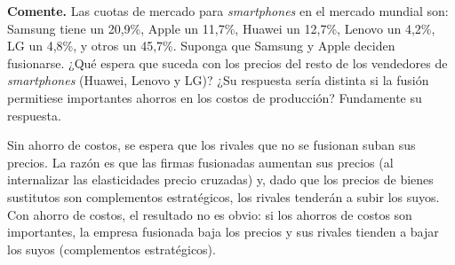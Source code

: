 \question \textbf{Comente.} Las cuotas de mercado para \emph{smartphones} en el mercado mundial son: Samsung tiene un 20,9\%, Apple un 11,7\%, Huawei un 12,7\%, Lenovo un 4,2\%, LG un 4,8\%, y otros un 45,7\%. Suponga que Samsung y Apple deciden fusionarse. ¿Qué espera que suceda con los precios del resto de los vendedores de \emph{smartphones} (Huawei, Lenovo y LG)? ¿Su respuesta sería distinta si la fusión permitiese importantes ahorros en los costos de producción? Fundamente su respuesta.
\begin{solution}
Sin ahorro de costos, se espera que los rivales que no se fusionan suban sus precios. La razón es que las firmas fusionadas aumentan sus precios (al internalizar las elasticidades precio cruzadas) y, dado que los precios de bienes sustitutos son complementos estratégicos, los rivales tenderán a subir los suyos. Con ahorro de costos, el resultado no es obvio: si los ahorros de costos son importantes, la empresa fusionada baja los precios y sus rivales tienden a bajar los suyos (complementos estratégicos).

\end{solution}

